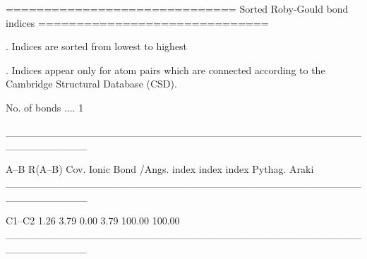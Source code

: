 
==============================
Sorted Roby-Gould bond indices
==============================

. Indices are sorted from lowest to highest

. Indices appear only for atom pairs which are connected
  according to the Cambridge Structural Database (CSD).

No. of bonds .... 1

___________________________________________________________

   A--B     R(A--B)    Cov.   Ionic   Bond    %
             /Angs.   index   index  index  Pythag.   Araki
___________________________________________________________

  C1--C2       1.26    3.79    0.00   3.79   100.00  100.00
___________________________________________________________
